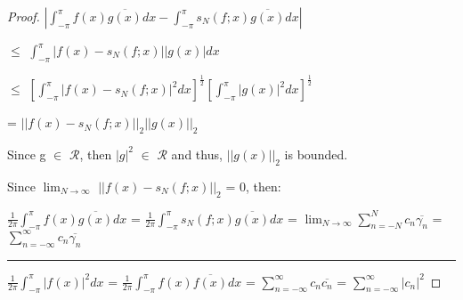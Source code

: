\begin{proof}
        \hspace{0.5cm}
        $|\int_{-\pi}^{\pi} f(x)\overline{g(x)} dx
            - \int_{-\pi}^{\pi} s_N(f;x)\overline{g(x)} dx|$

        \hspace{0.5cm}
        $\leq$ $\int_{-\pi}^{\pi} |f(x) - s_N(f;x)||g(x)| dx$

        \hspace{0.5cm}
        $\leq$ $[\int_{-\pi}^{\pi} |f(x) - s_N(f;x)|^2 dx]^{\frac{1}{2}}
                [\int_{-\pi}^{\pi} |g(x)|^2 dx]^{\frac{1}{2}}$

        \hspace{0.5cm}
        = $||f(x) -s_N(f;x)||_2 ||g(x)||_2$

        Since g $\in$ $\mathscr{R}$, then $|g|^2$ $\in$ $\mathscr{R}$
        and thus, $||g(x)||_2$ is bounded.

        Since $\lim_{N \rightarrow \infty}$ $||f(x) - s_N(f;x)||_2$ = 0, then:

        \hspace{0.2cm}
        $\frac{1}{2\pi} \int_{-\pi}^{\pi} f(x)\overline{g(x)} dx$
        = $\frac{1}{2\pi} \int_{-\pi}^{\pi} s_N(f;x)\overline{g(x)} dx$
        = $\lim_{N \rightarrow \infty} \sum_{n=-N}^N c_n \overline{\gamma_n}$
        = $\sum_{n=-\infty}^{\infty} c_n \overline{\gamma_n}$

        \rule[0.1cm]{16.7cm}{0.01cm}

        $\frac{1}{2\pi} \int_{-\pi}^{\pi} |f(x)|^2 dx$
        = $\frac{1}{2\pi} \int_{-\pi}^{\pi} f(x)\overline{f(x)} dx$
        = $\sum_{n=-\infty}^{\infty} c_n \overline{c_n}$
        = $\sum_{n=-\infty}^{\infty} |c_n|^2$
    \end{proof}    





